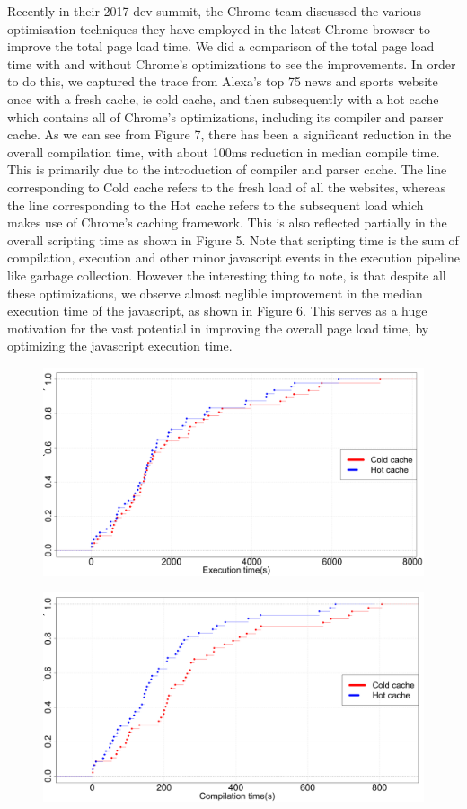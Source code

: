 Recently in their 2017 dev summit, the Chrome team discussed the various optimisation techniques
they have employed in the latest Chrome browser to improve the total page load time.
We did a comparison of the total page load time with and without Chrome's optimizations to see
the improvements. In order to do this, we captured the trace from Alexa's top 75 
news and sports website once with a fresh cache, ie cold cache, and then subsequently with a hot
cache which contains all of Chrome's optimizations, including its compiler and parser cache. 
As we can see from Figure 7, there has been a significant reduction in the overall compilation
time, with about 100ms reduction in median compile time. This is primarily due to the introduction of compiler and parser cache. 
The line corresponding to Cold cache refers to the fresh load of all the websites,
whereas the line corresponding to the Hot cache refers to the subsequent load
which makes use of Chrome's caching framework. 
This is also reflected partially in the overall scripting time
as shown in Figure 5. Note that scripting time is the sum of compilation, execution and other
minor javascript events in the execution pipeline like garbage collection. 
However the interesting thing to note, is that despite all these optimizations,
we observe almost neglible improvement in the median execution time of the javascript, as
shown in Figure 6. This serves as a huge motivation for the vast potential in
improving the overall page load time, by optimizing the javascript execution
time.

\begin{figure}[t]
\centering
\includegraphics[width=0.9\columnwidth]{figs/chrome_exec.png}
\label{fig:compile_p2}
\end{figure}

\begin{figure}[t]
\centering
\includegraphics[width=0.9\columnwidth]{figs/chrome_compile.png}
\label{fig:compile_p2}
\end{figure}

